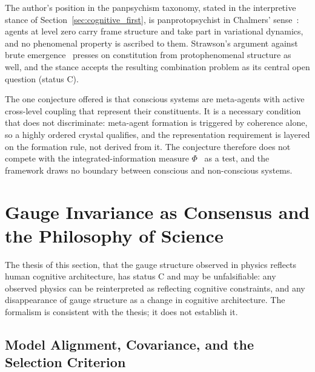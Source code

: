 \documentclass[11pt]{article}
\begin{document}
The author's position in the panpsychism taxonomy, stated in the interpretive stance of Section~\ref{sec:cognitive_first}, is panprotopsychist in Chalmers' sense~\cite{Chalmers2013consciousness, Chalmers2016}: agents at level zero carry frame structure and take part in variational dynamics, and no phenomenal property is ascribed to them. Strawson's argument against brute emergence~\cite{Strawson2006} presses on constitution from protophenomenal structure as well, and the stance accepts the resulting combination problem as its central open question (status C).

The one conjecture offered is that conscious systems are meta-agents with active cross-level coupling that represent their constituents. It is a necessary condition that does not discriminate: meta-agent formation is triggered by coherence alone, so a highly ordered crystal qualifies, and the representation requirement is layered on the formation rule, not derived from it. The conjecture therefore does not compete with the integrated-information measure $\Phi$~\cite{Tononi2004, Tononi2016} as a test, and the framework draws no boundary between conscious and non-conscious systems.

\section{Gauge Invariance as Consensus and the Philosophy of Science}\label{sec:gauge_invariance_consensus}

The thesis of this section, that the gauge structure observed in physics reflects human cognitive architecture, has status C and may be unfalsifiable: any observed physics can be reinterpreted as reflecting cognitive constraints, and any disappearance of gauge structure as a change in cognitive architecture. The formalism is consistent with the thesis; it does not establish it.

\subsection{Model Alignment, Covariance, and the Selection Criterion}
\end{document}
